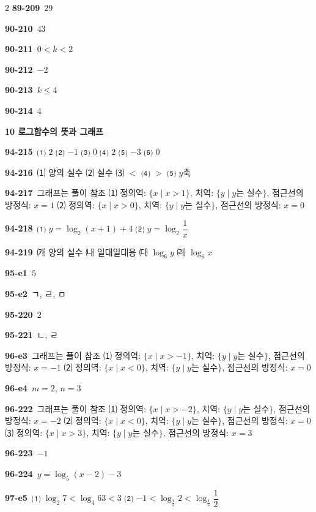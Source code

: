 \documentclass[10pt,a4paper]{article}
\begin{document}
\begin{multicols}{2}
\noindent\textbf{89-209}\ $29$\par
\noindent\textbf{90-210}\ $43$\par
\noindent\textbf{90-211}\ $0<k<2$\par
\noindent\textbf{90-212}\ $-2$\par
\noindent\textbf{90-213}\ $k\le 4$\par
\noindent\textbf{90-214}\ $4$\par
\noindent\textbf{10 로그함수의 뜻과 그래프}\par\smallskip
\noindent\textbf{94-215}\ ⑴ $2$ \quad ⑵ $-1$ \quad ⑶ $0$ \quad ⑷ $2$ \quad ⑸ $-3$ \quad ⑹ $0$\par
\noindent\textbf{94-216}\ ⑴ 양의 실수 \quad ⑵ 실수 \quad ⑶ $<$ \quad ⑷ $>$ \quad ⑸ $y$축\par
\noindent\textbf{94-217}\ 그래프는 풀이 참조 \quad ⑴ 정의역: $\{x \mid x>1\}$, 치역: $\{y \mid y$는 실수$\}$, 점근선의 방정식: $x=1$ \quad ⑵ 정의역: $\{x \mid x>0\}$, 치역: $\{y \mid y$는 실수$\}$, 점근선의 방정식: $x=0$\par
\noindent\textbf{94-218}\ ⑴ $y=\log_2 (x+1)+4$ \quad ⑵ $y=\log_2 \dfrac{1}{x}$\par
\noindent\textbf{94-219}\ ㈎ 양의 실수 \quad ㈏ 일대일대응 \quad ㈐ $\log_6 y$ \quad ㈑ $\log_6 x$\par
\noindent\textbf{95-e1}\ $5$\par
\noindent\textbf{95-e2}\ ㄱ, ㄹ, ㅁ\par
\noindent\textbf{95-220}\ $2$\par
\noindent\textbf{95-221}\ ㄴ, ㄹ\par
\noindent\textbf{96-e3}\ 그래프는 풀이 참조 \quad ⑴ 정의역: $\{x \mid x>-1\}$, 치역: $\{y \mid y$는 실수$\}$, 점근선의 방정식: $x=-1$ \quad ⑵ 정의역: $\{x \mid x<0\}$, 치역: $\{y \mid y$는 실수$\}$, 점근선의 방정식: $x=0$\par
\noindent\textbf{96-e4}\ $m=2$, $n=3$\par
\noindent\textbf{96-222}\ 그래프는 풀이 참조 \quad ⑴ 정의역: $\{x \mid x>-2\}$, 치역: $\{y \mid y$는 실수$\}$, 점근선의 방정식: $x=-2$ \quad ⑵ 정의역: $\{x \mid x<0\}$, 치역: $\{y \mid y$는 실수$\}$, 점근선의 방정식: $x=0$ \quad ⑶ 정의역: $\{x \mid x>3\}$, 치역: $\{y \mid y$는 실수$\}$, 점근선의 방정식: $x=3$\par
\noindent\textbf{96-223}\ $-1$\par
\noindent\textbf{96-224}\ $y=\log_5 (x-2)-3$\par
\noindent\textbf{97-e5}\ ⑴ $\log_2 7<\log_4 63<3$ \quad ⑵ $-1<\log_{\frac{1}{3}} 2<\log_{\frac{1}{3}} \dfrac{1}{2}$\par

\end{multicols}
\end{document}
